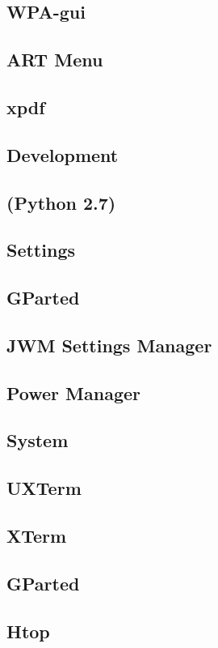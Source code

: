 \documentclass[12pt,a4paper]{book}
\begin{document}
\subsection{WPA-gui}
\subsection{ART Menu}
\subsection{xpdf}
\subsection{Development}
\subsection{(Python 2.7)}

\subsection{Settings}
\subsection{GParted}
\subsection{JWM Settings Manager}
\subsection{Power Manager}

\subsection{System}
\subsection{UXTerm}
\subsection{XTerm}
\subsection{GParted}
\subsection{Htop}
\end{document}

